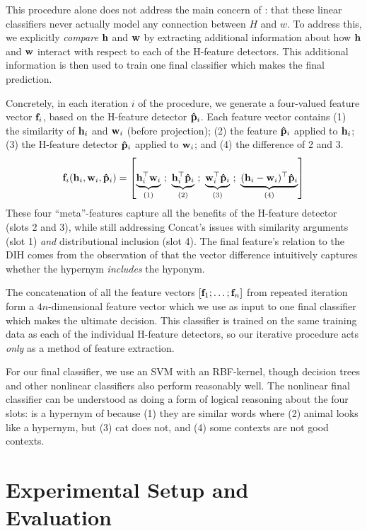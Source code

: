 This procedure alone does not address the main concern of
: that these linear classifiers never actually model
any connection between $H$ and $w$.  To address this, we explicitly {\em
compare} ${\mathbf{h}}$ and ${\mathbf{w}}$ by extracting additional information about how ${\mathbf{h}}$
and ${\mathbf{w}}$ interact with respect to each of the H-feature detectors. This
additional information is then used to train one final classifier which makes
the final prediction.

Concretely, in each iteration $i$ of the procedure, we generate a four-valued
feature vector
${\mathbf{f}}_i$, based on the H-feature detector ${\mathbf{\hat p}}_i$. Each
feature vector contains (1) the similarity of ${\mathbf{h}}_i$ and ${\mathbf{w}}_i$ (before projection);
(2) the feature
${\mathbf{\hat p}}_i$ applied to ${\mathbf{h}}_i$; (3) the H-feature detector ${\mathbf{\hat p}}_i$ applied to ${\mathbf{w}}_i$; and
(4) the difference of 2 and 3.
\begin{align*}
  {\mathbf{f}}_i({\mathbf{h}}_i, {\mathbf{w}}_i, {\mathbf{\hat p}}_i) = \left[ \underbrace{{\mathbf{h}}_i^{\top}{\mathbf{w}}_i}_{(1)}~;~\underbrace{{\mathbf{h}}_i^{\top}{\mathbf{\hat p}}_i}_{(2)}~;~\underbrace{{\mathbf{w}}_i^{\top}{\mathbf{\hat p}}_i}_{(3)}~;~\underbrace{({\mathbf{h}}_i - {\mathbf{w}}_i)^{\top}{\mathbf{\hat p}}_i}_{(4)} \right]
\end{align*}
These four ``meta''-features capture all the benefits of the
H-feature detector (slots 2 and 3), while still addressing Concat's issues with
similarity arguments (slot 1) {\em and} distributional inclusion (slot 4).
The final feature's relation to the DIH comes from the observation of
 that the vector difference intuitively captures
whether the hypernym {\em includes} the hyponym.

The concatenation of all the feature vectors $[{\mathbf{f}}_1; \ldots; {\mathbf{f}}_n]$ from repeated iteration
form a $4n$-dimensional feature vector which we use as input to one final
classifier which makes the ultimate decision.  This classifier is trained on
the same training data as each of the individual H-feature detectors, so
our iterative procedure acts {\em only} as a method of feature
extraction.

For our final classifier, we use an SVM with an RBF-kernel, though decision
trees and other nonlinear classifiers also perform reasonably well. The
nonlinear final classifier can be understood as doing a form of logical
reasoning about the four slots:  is a hypernym of  because
(1) they are similar words where (2) animal looks like a hypernym, but (3) cat
does not, and (4) some  contexts are not good  contexts.


\section{Experimental Setup and Evaluation}

